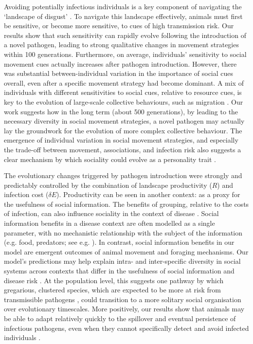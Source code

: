 Avoiding potentially infectious individuals is a key component of navigating the `landscape of disgust' \citep{weinstein2018}.
To navigate this landscape effectively, animals must first be sensitive, or become more sensitive, to cues of high transmission risk.
Our results show that such sensitivity can rapidly evolve following the introduction of a novel pathogen, leading to strong qualitative changes in movement strategies within 100 generations.
Furthermore, on average, individuals' sensitivity to social movement cues actually increases after pathogen introduction.
However, there was substantial between-individual variation in the importance of social cues overall, even after a specific movement strategy had become dominant.
A mix of individuals with different sensitivities to social cues, relative to resource cues, is key to the evolution of large-scale collective behaviours, such as migration \citep{guttal2010}.
Our work suggests how in the long term (about 500 generations), by leading to the necessary diversity in social movement strategies, a novel pathogen may actually lay the groundwork for the evolution of more complex collective behaviour.
The emergence of individual variation in social movement strategies, and especially the trade-off between movement, associations, and infection risk also suggests a clear mechanism by which sociality could evolve as a personality trait \citep[][]{gartland2021}.

The evolutionary changes triggered by pathogen introduction were strongly and predictably controlled by the combination of landscape productivity ($R$) and infection cost ($\delta E$).
Productivity can be seen in another context: as a proxy for the usefulness of social information.
The benefits of grouping, relative to the costs of infection, can also influence sociality in the context of disease \citep{almberg2015,ezenwa2016}.
Social information benefits in a disease context are often modelled as a single parameter, with no mechanistic relationship with the subject of the information (e.g. food, predators; see e.g. \citealt{ashby2022}). 
In contrast, social information benefits in our model are emergent outcomes of animal movement and foraging mechanisms.
Our model's predictions may help explain intra- and inter-specific diversity in social systems across contexts that differ in the usefulness of social information and disease risk \citep{lott1991, sah2018}.
At the population level, this suggests one pathway by which gregarious, clustered species, which are expected to be more at risk from transmissible pathogens \citep{sah2018}, could transition to a more solitary social organisation over evolutionary timescales.
More positively, our results show that animals may be able to adapt relatively quickly to the spillover and eventual persistence of infectious pathogens, even when they cannot specifically detect and avoid infected individuals \citep{stroeymeyt2018}.

